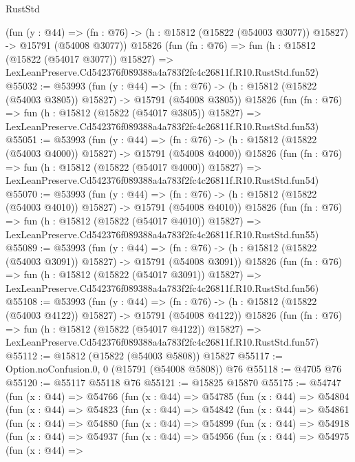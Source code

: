 \begin{lexlean}{RustStd}
\begin{coremodule}
    (fun (y : @44) =>
    (fn : @76) -> (h : @15812 (@15822 (@54003 @3077)) @15827) -> @15791 (@54008 @3077))
    @15826
    (fun (fn : @76) =>
    fun (h : @15812 (@15822 (@54017 @3077)) @15827) =>
    LexLeanPreserve.Cd542376f089388a4a783f2fc4c26811f.R10.RustStd.fun52)
@55032 := @53993
    (fun (y : @44) =>
    (fn : @76) -> (h : @15812 (@15822 (@54003 @3805)) @15827) -> @15791 (@54008 @3805))
    @15826
    (fun (fn : @76) =>
    fun (h : @15812 (@15822 (@54017 @3805)) @15827) =>
    LexLeanPreserve.Cd542376f089388a4a783f2fc4c26811f.R10.RustStd.fun53)
@55051 := @53993
    (fun (y : @44) =>
    (fn : @76) -> (h : @15812 (@15822 (@54003 @4000)) @15827) -> @15791 (@54008 @4000))
    @15826
    (fun (fn : @76) =>
    fun (h : @15812 (@15822 (@54017 @4000)) @15827) =>
    LexLeanPreserve.Cd542376f089388a4a783f2fc4c26811f.R10.RustStd.fun54)
@55070 := @53993
    (fun (y : @44) =>
    (fn : @76) -> (h : @15812 (@15822 (@54003 @4010)) @15827) -> @15791 (@54008 @4010))
    @15826
    (fun (fn : @76) =>
    fun (h : @15812 (@15822 (@54017 @4010)) @15827) =>
    LexLeanPreserve.Cd542376f089388a4a783f2fc4c26811f.R10.RustStd.fun55)
@55089 := @53993
    (fun (y : @44) =>
    (fn : @76) -> (h : @15812 (@15822 (@54003 @3091)) @15827) -> @15791 (@54008 @3091))
    @15826
    (fun (fn : @76) =>
    fun (h : @15812 (@15822 (@54017 @3091)) @15827) =>
    LexLeanPreserve.Cd542376f089388a4a783f2fc4c26811f.R10.RustStd.fun56)
@55108 := @53993
    (fun (y : @44) =>
    (fn : @76) -> (h : @15812 (@15822 (@54003 @4122)) @15827) -> @15791 (@54008 @4122))
    @15826
    (fun (fn : @76) =>
    fun (h : @15812 (@15822 (@54017 @4122)) @15827) =>
    LexLeanPreserve.Cd542376f089388a4a783f2fc4c26811f.R10.RustStd.fun57)
@55112 := @15812 (@15822 (@54003 @5808)) @15827
@55117 := Option.noConfusion.{0, 0} (@15791 (@54008 @5808)) @76
@55118 := @4705 @76
@55120 := @55117 @55118 @76
@55121 := @15825 @15870
@55175 := @54747
    (fun (x : @44) =>
    @54766
      (fun (x : @44) =>
      @54785
        (fun (x : @44) =>
        @54804
          (fun (x : @44) =>
          @54823
            (fun (x : @44) =>
            @54842
              (fun (x : @44) =>
              @54861
                (fun (x : @44) =>
                @54880
                  (fun (x : @44) =>
                  @54899
                    (fun (x : @44) =>
                    @54918
                      (fun (x : @44) =>
                      @54937
                        (fun (x : @44) =>
                        @54956
                          (fun (x : @44) =>
                          @54975
                            (fun (x : @44) =>

\end{coremodule}
\end{lexlean}
